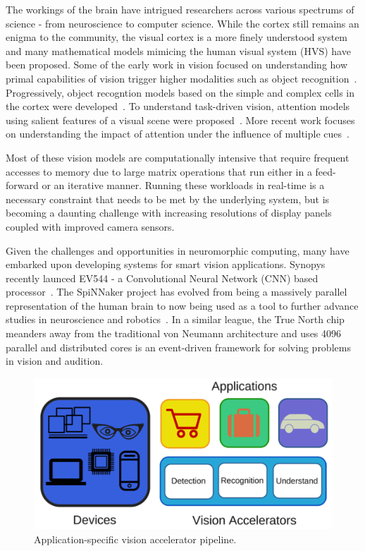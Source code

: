 The workings of the brain have intrigued researchers across various spectrums of science - from neuroscience to computer science. While the cortex still remains 
an enigma to the community, the visual cortex is a more finely understood system and many mathematical models mimicing the 
human visual system (HVS) have been proposed. Some of the early work in vision focused on understanding how primal capabilities of vision trigger higher modalities 
such as object recognition~\cite{marr}. Progressively, object recogntion models based on the simple and complex cells in the cortex were developed~\cite{Mutch2008}. 
To understand task-driven vision, attention models using salient features of 
a visual scene were proposed~\cite{Bruce2006, Itti2001}. More recent work focuses on understanding the impact of attention under the influence of multiple cues~\cite{wyble2014}.

Most of these vision models are computationally intensive that require frequent accesses to memory due to large matrix operations 
that run either in a feed-forward or an iterative manner. 
Running these workloads in real-time is a necessary constraint that needs 
to be met by the underlying system, but is becoming a daunting challenge with increasing resolutions of 
display panels coupled with improved camera sensors.

Given the challenges and opportunities in neuromorphic computing, many have embarked upon developing systems for smart vision applications. 
Synopys recently launced EV544 - a Convolutional Neural Network (CNN) based processor~\cite{syncnn}.
The SpiNNaker project has evolved from being a massively parallel representation of the human brain to now being used as a tool to further advance studies in 
neuroscience and robotics~\cite{spinnaker}. In a similar league, the True North chip~\cite{truenorth} meanders away from the traditional 
von Neumann architecture and uses 4096 parallel and distributed cores is an event-driven framework for solving problems in vision and audition.

\begin{figure}[!htb]
\vspace{0pt}
\centering
\includegraphics[width=0.9\linewidth]{./figures/vision_apps_devices.png}
\vspace{0pt}
\caption{Application-specific vision accelerator pipeline.}
\label{fig:iot}
\vspace{0pt}
\end{figure}

